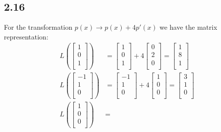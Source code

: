 \documentclass[letterpaper,12pt]{article}
\theoremstyle{definition}
\begin{document}
\subsection*{2.16}
For the transformation $p(x) \rightarrow p(x) + 4p'(x)$ we have the matrix representation:
\begin{align*}
    L\left( \begin{bmatrix} 1 \\ 0 \\ 1 \\ \end{bmatrix} \right) &= 
    \begin{bmatrix} 1 \\ 0 \\ 1 \\ \end{bmatrix} + 4\begin{bmatrix} 0 \\ 2 \\ 0 \\ \end{bmatrix} =
    \begin{bmatrix} 1 \\ 8 \\ 1 \\ \end{bmatrix} \\
    L\left( \begin{bmatrix} -1 \\ 1 \\ 0 \\ \end{bmatrix} \right) &= 
    \begin{bmatrix} -1 \\ 1 \\ 0 \\ \end{bmatrix} + 4\begin{bmatrix} 1 \\ 0 \\ 0 \\ \end{bmatrix} =
    \begin{bmatrix} 3 \\ 1 \\ 0 \\ \end{bmatrix} \\
    L\left( \begin{bmatrix} 1 \\ 0 \\ 0 \\ \end{bmatrix} \right) &= 

\end{align*}
\end{document}
